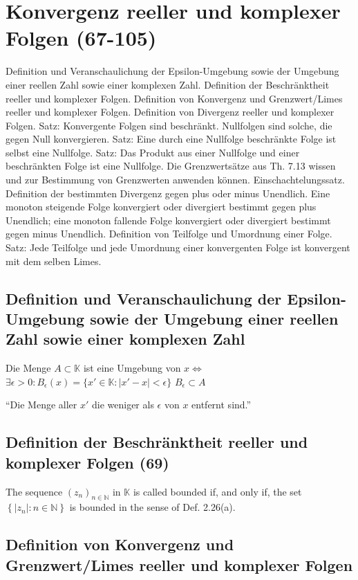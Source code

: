 \section{Konvergenz reeller und komplexer Folgen (67-105)}
 
Definition und Veranschaulichung der Epsilon-Umgebung sowie der Umgebung einer reellen Zahl sowie einer komplexen Zahl. Definition der Beschränktheit reeller und komplexer Folgen. Definition von Konvergenz und Grenzwert/Limes reeller und komplexer Folgen. Definition von Divergenz reeller und komplexer Folgen. Satz: Konvergente Folgen sind beschränkt. Nullfolgen sind solche, die gegen Null konvergieren. Satz: Eine durch eine Nullfolge beschränkte Folge ist selbst eine Nullfolge. Satz: Das Produkt aus einer Nullfolge und einer beschränkten Folge ist eine Nullfolge. Die Grenzwertsätze aus Th. 7.13 wissen und zur Bestimmung von Grenzwerten anwenden können. Einschachtelungssatz. Definition der bestimmten Divergenz gegen plus oder minus Unendlich. Eine monoton steigende Folge konvergiert oder divergiert bestimmt gegen plus Unendlich; eine monoton fallende Folge konvergiert oder divergiert bestimmt gegen minus Unendlich. Definition von Teilfolge und Umordnung einer Folge. Satz: Jede Teilfolge und jede Umordnung einer konvergenten Folge ist konvergent mit dem selben Limes. 


\subsection{Definition und Veranschaulichung der Epsilon-Umgebung sowie der Umgebung einer reellen Zahl sowie einer komplexen Zahl}
Die Menge $A \subset \mathbb{K}$ ist eine Umgebung von $x \Leftrightarrow$ 
$\exists \epsilon > 0 : B_{\epsilon}(x) = \{x' \in \mathbb{K} : |x'-x| < \epsilon\}$
$B_{\epsilon} \subset A$

“Die Menge aller $x'$ die weniger als $\epsilon$ von $x$ entfernt sind.”


\subsection{Definition der Beschränktheit reeller und komplexer Folgen (69)}
The sequence $(z _ { n }) _ { n \in \mathbb { N } }$  in $\mathbb{K}$ is called bounded if, and only if, the set
$\left\{ | z _ { n } | : n \in \mathbb { N } \right\}$ is bounded in the sense of Def. 2.26(a).

\subsection{Definition von Konvergenz und Grenzwert/Limes reeller und komplexer Folgen}

